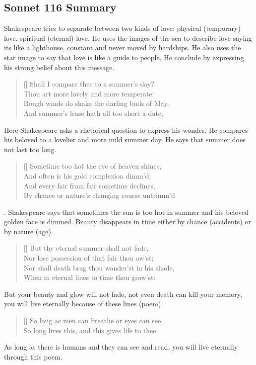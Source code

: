 \documentclass[12pt, a4paper]{article}
\begin{document}
\subsection*{Sonnet 116 Summary}
{\fontpar
Shakespeare tries to separate between two kinds of love:
physical (temporary) love, spiritual
(eternal) love. He uses the images of the sea to describe love
saying its like a lighthouse, constant and never moved by hardships.
He also uses the star image to say that love is like a guide to people.
He conclude by expressing his strong belief about this message.
}

\settowidth{\versewidth}{Shall I compare thee to a summer’s day?}
\begin{verse}[\versewidth]
{\fontverse
Shall I compare thee to a summer’s day?\\
Thou art more lovely and more temperate: \\
Rough winds do shake the darling buds of May, \\
And summer’s lease hath all too short a date; 
}
\end{verse}
{\fontpar
Here Shakespeare asks a rhetorical question to 
express his wonder. He compares his beloved to a lovelier and
more mild summer day. He says that summer does not last too long.
}

\begin{verse}[\versewidth]
{\fontverse
Sometime too hot the eye of heaven shines, \\
And often is his gold complexion dimm'd; \\
And every fair from fair sometime declines, \\
By chance or nature’s changing course untrimm'd
}
\end{verse}

{\fontpar
{}. Shakespeare says that sometimes
the sun is too hot in summer and his beloved golden face is dimmed.
Beauty disappears in time either by chance (accidents) or by
nature (age).
}

\begin{verse}[\versewidth]
{\fontverse
But thy eternal summer shall not fade, \\
Nor lose possession of that fair thou ow’st; \\
Nor shall death brag thou wander’st in his shade, \\
When in eternal lines to time thou grow’st:
}
\end{verse}
{\fontpar
But your beauty and glow will not fade, not even death can
kill your memory, you will live eternally because of these
lines (poem).
}
\begin{verse}[\versewidth]
{\fontverse
So long as men can breathe or eyes can see,\\
So long lives this, and this gives life to thee.
}
\end{verse}
{\fontpar
As long as there is humans and they can see and read,
you will live eternally through this poem.
}
\end{document}
